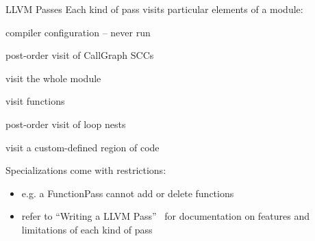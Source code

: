 \begin{frame}{LLVM Passes}
Each kind of pass visits particular elements of a module:

\begin{description}[align=left, labelwidth=1cm]
\item[ImmutablePass] compiler configuration -- never run
\item[CallGraphSCCPass] post-order visit of CallGraph SCCs
\item[ModulePass] visit the whole module
\item[FunctionPass] visit functions
\item[LoopPass] post-order visit of loop nests
\item[RegionPass] visit a custom-defined region of code
\end{description}

\vfill
Specializations come with restrictions:

\begin{itemize}
\item e.g. a \alert{FunctionPass} cannot add or delete functions
\item refer to ``Writing a LLVM Pass''~\cite{LOCAL:www/llvmWritingAPass,LOCAL:www/llvmWritingAPassNew}
      for documentation on features and limitations of each kind of pass
\end{itemize}
\end{frame}


%
%
%
%


